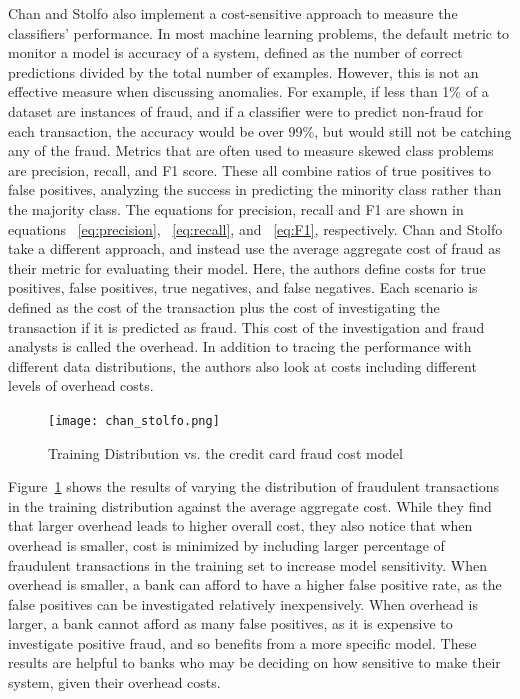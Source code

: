 \documentclass[midd]{thesis}
\begin{document}
Chan and Stolfo also implement a cost-sensitive approach to measure the classifiers' performance. In most machine learning problems, the default metric to monitor a model is accuracy of a system, defined as the number of correct predictions divided by the total number of examples. However, this is not an effective measure when discussing anomalies. For example, if less than 1\% of a dataset are instances of fraud, and if a classifier were to predict non-fraud for each transaction, the accuracy would be over 99\%, but would still not be catching any of the fraud. Metrics that are often used to measure skewed class problems are precision, recall, and F1 score. These all combine ratios of true positives to false positives, analyzing the success in predicting the minority class rather than the majority class.  The equations for precision, recall and F1 are shown in equations ~\ref{eq:precision}, ~\ref{eq:recall}, and ~\ref{eq:F1}, respectively. Chan and Stolfo take a different approach, and instead use the average aggregate cost of fraud as their metric for evaluating their model. Here, the authors define costs for true positives, false positives, true negatives, and false negatives. Each scenario is defined as the cost of the transaction plus the cost of investigating the transaction if it is predicted as fraud. This cost of the investigation and fraud analysts is called the overhead. In addition to tracing the performance with different data distributions, the authors also look at costs including different levels of overhead costs.  

\begin{figure}
  \texttt{[image: chan\_stolfo.png]}
  \caption{Training Distribution vs. the credit card fraud cost model \cite{Chan}}
  \label{fig:chan}
\end{figure}

Figure~\ref{fig:chan} shows the results of varying the distribution of fraudulent transactions in the training distribution against the average aggregate cost\cite{Chan}. While they find that larger overhead leads to higher overall cost, they also notice that when overhead is smaller, cost is minimized by including larger percentage of fraudulent transactions in the training set to increase model sensitivity. When overhead is smaller, a bank can afford to have a higher false positive rate, as the false positives can be investigated relatively inexpensively. When overhead is larger, a bank cannot afford as many false positives, as it is expensive to investigate positive fraud, and so benefits from a more specific model. These results are helpful to banks who may be deciding on how sensitive to make their system, given their overhead costs.
\end{document}

